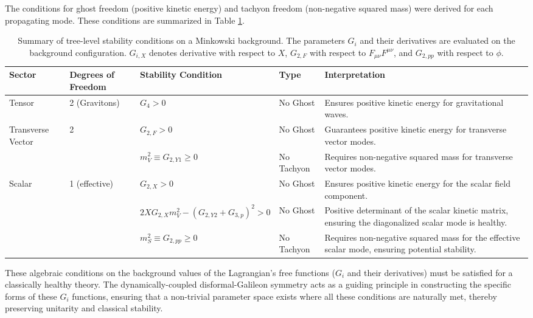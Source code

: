 \documentclass[twocolumn]{aastex631}
\begin{document}
The conditions for ghost freedom (positive kinetic energy) and tachyon freedom (non-negative squared mass) were derived for each propagating mode. These conditions are summarized in Table \ref{tab:stability_conditions}.

\begin{table}[ht!]
\caption{Summary of tree-level stability conditions on a Minkowski background. The parameters $G_i$ and their derivatives are evaluated on the background configuration. $G_{i,X}$ denotes derivative with respect to $X$, $G_{2,F}$ with respect to $F_{\mu\nu}F^{\mu\nu}$, and $G_{2,pp}$ with respect to $\phi$.}
\label{tab:stability_conditions}
\centering
\begin{tabular}{p{} p{} p{} p{} p{}}
\toprule
\textbf{Sector} & \textbf{Degrees of Freedom} & \textbf{Stability Condition} & \textbf{Type} & \textbf{Interpretation} \\
\midrule
Tensor & 2 (Gravitons) & $G_4 > 0$ & No Ghost & Ensures positive kinetic energy for gravitational waves. \\
Transverse Vector & 2 & $G_{2,F} > 0$ & No Ghost & Guarantees positive kinetic energy for transverse vector modes. \\
& & $m_V^2 \equiv G_{2,Y1} \ge 0$ & No Tachyon & Requires non-negative squared mass for transverse vector modes. \\
Scalar & 1 (effective) & $G_{2,X} > 0$ & No Ghost & Ensures positive kinetic energy for the scalar field component. \\
& & $2X G_{2,X} m_V^2 - (G_{2,Y2} + G_{3,p})^2 > 0$ & No Ghost & Positive determinant of the scalar kinetic matrix, ensuring the diagonalized scalar mode is healthy. \\
& & $m_S^2 \equiv G_{2,pp} \ge 0$ & No Tachyon & Requires non-negative squared mass for the effective scalar mode, ensuring potential stability. \\
\bottomrule
\end{tabular}
\end{table}

These algebraic conditions on the background values of the Lagrangian's free functions ($G_i$ and their derivatives) must be satisfied for a classically healthy theory. The dynamically-coupled disformal-Galileon symmetry acts as a guiding principle in constructing the specific forms of these $G_i$ functions, ensuring that a non-trivial parameter space exists where all these conditions are naturally met, thereby preserving unitarity and classical stability.
\end{document}
